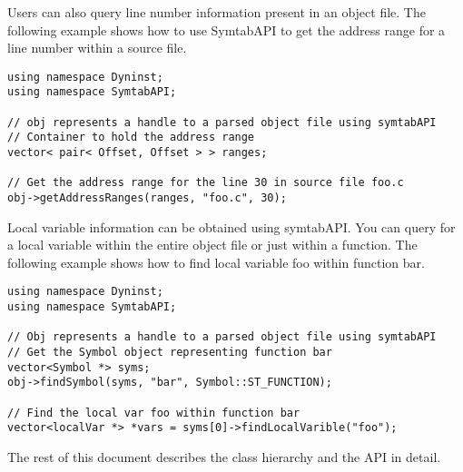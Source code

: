 Users can also query line number information present in an object file. The following example shows how to use SymtabAPI to get the address range for a line number within a source file.

\begin{lstlisting}
using namespace Dyninst;
using namespace SymtabAPI;

// obj represents a handle to a parsed object file using symtabAPI
// Container to hold the address range
vector< pair< Offset, Offset > > ranges;

// Get the address range for the line 30 in source file foo.c
obj->getAddressRanges(ranges, "foo.c", 30);
\end{lstlisting}

Local variable information can be obtained using symtabAPI. You can query for a local variable within the entire object file or just within a function. The following example shows how to find local variable foo within function bar.

\begin{lstlisting}
using namespace Dyninst;
using namespace SymtabAPI;

// Obj represents a handle to a parsed object file using symtabAPI
// Get the Symbol object representing function bar
vector<Symbol *> syms;
obj->findSymbol(syms, "bar", Symbol::ST_FUNCTION);

// Find the local var foo within function bar
vector<localVar *> *vars = syms[0]->findLocalVarible("foo");
\end{lstlisting}

The rest of this document describes the class hierarchy and the API in detail.
